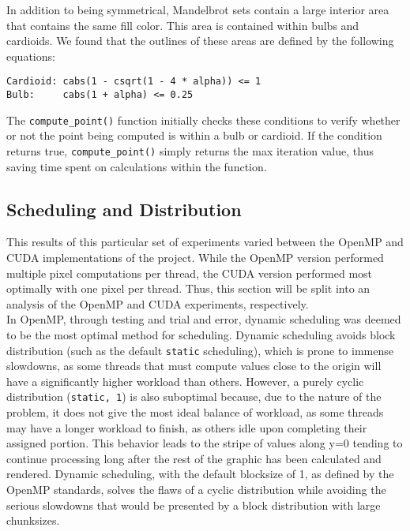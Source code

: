\documentclass{article}
\begin{document}
In addition to being symmetrical, Mandelbrot sets contain a large interior area that contains the same fill color.
This area is contained within bulbs and cardioids.
We found that the outlines of these areas are defined by the following equations:

\begin{verbatim}
Cardioid: cabs(1 - csqrt(1 - 4 * alpha)) <= 1
Bulb:     cabs(1 + alpha) <= 0.25
\end{verbatim}

The \verb|compute_point()| function initially checks these conditions to verify whether or not the point being computed is within a bulb or cardioid.
If the condition returns true, \verb|compute_point()| simply returns the max iteration value, thus saving time spent on calculations within the function.

\subsection{Scheduling and Distribution}

This results of this particular set of experiments varied between the OpenMP and CUDA implementations of the project.
While the OpenMP version performed multiple pixel computations per thread, the CUDA version performed most optimally with one pixel per thread.
Thus, this section will be split into an analysis of the OpenMP and CUDA experiments, respectively.\\

In OpenMP, through testing and trial and error, dynamic scheduling was deemed to be the most optimal method for scheduling. Dynamic scheduling avoids block distribution (such as the default \verb|static| scheduling), which is prone to immense slowdowns, as some threads that must compute values close to the origin will have a significantly higher workload than others.
However, a purely cyclic distribution (\verb|static, 1|) is also suboptimal because, due to the nature of the problem, it does not give the most ideal balance of workload, as some threads may have a longer workload to finish, as others idle upon completing their assigned portion. This behavior leads to the stripe of values along y=0 tending to continue processing long after the rest of the graphic has been calculated and rendered.
Dynamic scheduling, with the default blocksize of 1, as defined by the OpenMP standards, solves the flaws of a cyclic distribution while avoiding the serious slowdowns that would be presented by a block distribution with large chunksizes.\\
\end{document}
